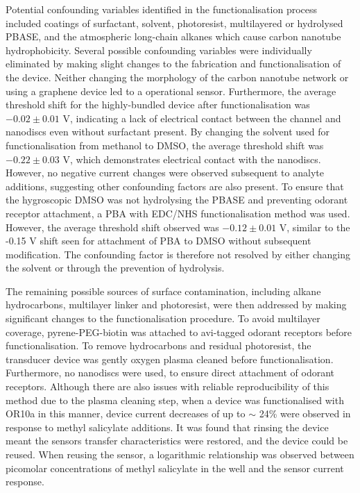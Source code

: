 \documentclass[
  a4paper,
]{scrbook}
\begin{document}
Potential confounding variables identified in the functionalisation
process included coatings of surfactant, solvent, photoresist,
multilayered or hydrolysed PBASE, and the atmospheric long-chain alkanes
which cause carbon nanotube hydrophobicity. Several possible confounding
variables were individually eliminated by making slight changes to the
fabrication and functionalisation of the device. Neither changing the
morphology of the carbon nanotube network or using a graphene device led
to a operational sensor. Furthermore, the average threshold shift for
the highly-bundled device after functionalisation was \(−0.02\pm0.01\)
V, indicating a lack of electrical contact between the channel and
nanodiscs even without surfactant present. By changing the solvent used
for functionalisation from methanol to DMSO, the average threshold shift
was \(−0.22\pm0.03\) V, which demonstrates electrical contact with the
nanodiscs. However, no negative current changes were observed subsequent
to analyte additions, suggesting other confounding factors are also
present. To ensure that the hygroscopic DMSO was not hydrolysing the
PBASE and preventing odorant receptor attachment, a PBA with EDC/NHS
functionalisation method was used. However, the average threshold shift
observed was \(-0.12\pm0.01\) V, similar to the -0.15 V shift seen for
attachment of PBA to DMSO without subsequent modification. The
confounding factor is therefore not resolved by either changing the
solvent or through the prevention of hydrolysis.

The remaining possible sources of surface contamination, including
alkane hydrocarbons, multilayer linker and photoresist, were then
addressed by making significant changes to the functionalisation
procedure. To avoid multilayer coverage, pyrene-PEG-biotin was attached
to avi-tagged odorant receptors before functionalisation. To remove
hydrocarbons and residual photoresist, the transducer device was gently
oxygen plasma cleaned before functionalisation. Furthermore, no
nanodiscs were used, to ensure direct attachment of odorant receptors.
Although there are also issues with reliable reproducibility of this
method due to the plasma cleaning step, when a device was functionalised
with OR10a in this manner, device current decreases of up to \(\sim\)
24\% were observed in response to methyl salicylate additions. It was
found that rinsing the device meant the sensors transfer characteristics
were restored, and the device could be reused. When reusing the sensor,
a logarithmic relationship was observed between picomolar concentrations
of methyl salicylate in the well and the sensor current response.
\end{document}
